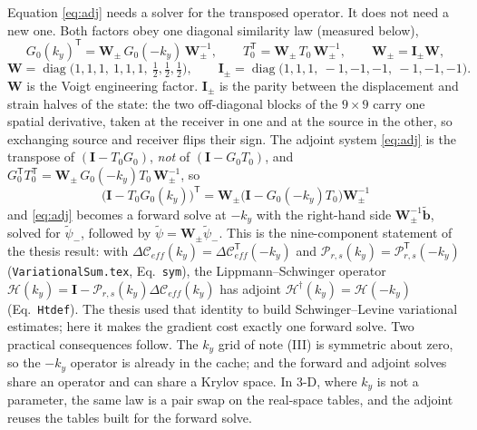 \documentclass[11pt,a4paper]{article}
\newcommand{\Tz}{T_0}
\newcommand{\Gz}{G_0}
\newcommand{\bW}{\mathbf{W}}
\newcommand{\bI}{\mathbf{I}}
\newcommand{\T}{\mathsf{T}}
\begin{document}
Equation \eqref{eq:adj} needs a solver for the transposed operator. It does not need a new one.
Both factors obey one diagonal similarity law (measured below),
\begin{equation}\label{eq:laws}
  \Gz(k_y)^{\T} = \mathbf{W}_{\pm}\,\Gz(-k_y)\,\mathbf{W}_{\pm}^{-1},
  \qquad
  \Tz^{\T} = \mathbf{W}_{\pm}\,\Tz\,\mathbf{W}_{\pm}^{-1},
  \qquad
  \mathbf{W}_{\pm} = \mathbf{I}_{\pm}\bW,
\end{equation}
\begin{equation*}
  \bW = \operatorname{diag}\bigl(1,1,1,\ 1,1,1,\ \tfrac12,\tfrac12,\tfrac12\bigr),
  \qquad
  \mathbf{I}_{\pm} = \operatorname{diag}\bigl(1,1,1,\ -1,-1,-1,\ -1,-1,-1\bigr).
\end{equation*}
$\bW$ is the Voigt engineering factor. $\mathbf{I}_{\pm}$ is the parity between the displacement and
strain halves of the state: the two off-diagonal blocks of the $9\times9$ carry one spatial
derivative, taken at the receiver in one and at the source in the other, so exchanging source and
receiver flips their sign. The adjoint system \eqref{eq:adj} is the transpose of
$(\bI - \Tz\Gz)$, \emph{not} of $(\bI-\Gz\Tz)$, and
$\Gz^{\T}\Tz^{\T} = \mathbf{W}_{\pm}\,\Gz(-k_y)\Tz\,\mathbf{W}_{\pm}^{-1}$, so
\begin{equation}\label{eq:selfadj}
  \boxed{\;
  \bigl(\bI - \Tz\Gz(k_y)\bigr)^{\T} = \mathbf{W}_{\pm}\bigl(\bI - \Gz(-k_y)\Tz\bigr)\mathbf{W}_{\pm}^{-1}
  \;}
\end{equation}
and \eqref{eq:adj} becomes a forward solve at $-k_y$ with the right-hand side
$\mathbf{W}_{\pm}^{-1}\tilde{\mathbf b}$, solved for $\tilde\psi_{-}$, followed by $\tilde\psi = \mathbf{W}_{\pm}\tilde\psi_{-}$. This is the nine-component statement of the
thesis result: with $\Delta\mathcal{C}_{\mathit{eff}}(k_y) = \Delta\mathcal{C}^{\T}_{\mathit{eff}}(-k_y)$
and $\mathcal{P}_{r,s}(k_y) = \mathcal{P}^{\T}_{r,s}(-k_y)$ (\texttt{VariationalSum.tex},
Eq.~\texttt{sym}), the Lippmann--Schwinger operator
$\mathcal{H}(k_y) = \bI - \mathcal{P}_{r,s}(k_y)\Delta\mathcal{C}_{\mathit{eff}}(k_y)$ has adjoint
$\mathcal{H}^\dagger(k_y) = \mathcal{H}(-k_y)$ (Eq.~\texttt{Htdef}). The thesis used that identity
to build Schwinger--Levine variational estimates; here it makes the gradient cost exactly one
forward solve. Two practical consequences follow. The $k_y$ grid of note (III) is symmetric about
zero, so the $-k_y$ operator is already in the cache; and the forward and adjoint solves share an
operator and can share a Krylov space. In 3-D, where $k_y$ is not a parameter, the same law is a
pair swap on the real-space tables, and the adjoint reuses the tables built for the forward solve.
\end{document}
